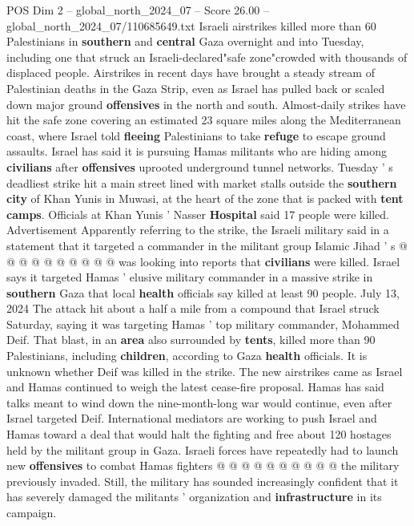 \begin{textsample}{POS Dim 2 – global\_north\_2024\_07 – Score 26.00 – global\_north\_2024\_07/110685649.txt}  \label{ex:f2_pos_389}
Israeli airstrikes killed more than 60 Palestinians in \textbf{southern} and \textbf{central} Gaza overnight and into Tuesday, including one that struck an Israeli-declared"safe zone"crowded with thousands of displaced people.
Airstrikes in recent days have brought a steady stream of Palestinian deaths in the Gaza Strip, even as Israel has pulled back or scaled down major ground \textbf{offensives} in the north and south.
Almost-daily strikes have hit the safe zone covering an estimated 23 square miles along the Mediterranean coast, where Israel told \textbf{fleeing} Palestinians to take \textbf{refuge} to escape ground assaults.
Israel has said it is pursuing Hamas militants who are hiding among \textbf{civilians} after \textbf{offensives} uprooted underground tunnel networks.
Tuesday ' s deadliest strike hit a main street lined with market stalls outside the \textbf{southern} \textbf{city} of Khan Yunis in Muwasi, at the heart of the zone that is packed with \textbf{tent} \textbf{camps}.
Officials at Khan Yunis ' Nasser \textbf{Hospital} said 17 people were killed.
Advertisement Apparently referring to the strike, the Israeli military said in a statement that it targeted a commander in the militant group Islamic Jihad ' s @ @ @ @ @ @ @ @ @ @ was looking into reports that \textbf{civilians} were killed.
Israel says it targeted Hamas ' elusive military commander in a massive strike in \textbf{southern} Gaza that local \textbf{health} officials say killed at least 90 people.
July 13, 2024 The attack hit about a half a mile from a compound that Israel struck Saturday, saying it was targeting Hamas ' top military commander, Mohammed Deif.
That blast, in an \textbf{area} also surrounded by \textbf{tents}, killed more than 90 Palestinians, including \textbf{children}, according to Gaza \textbf{health} officials.
It is unknown whether Deif was killed in the strike.
The new airstrikes came as Israel and Hamas continued to weigh the latest cease-fire proposal.
Hamas has said talks meant to wind down the nine-month-long war would continue, even after Israel targeted Deif.
International mediators are working to push Israel and Hamas toward a deal that would halt the fighting and free about 120 hostages held by the militant group in Gaza.
Israeli forces have repeatedly had to launch new \textbf{offensives} to combat Hamas fighters @ @ @ @ @ @ @ @ @ @ the military previously invaded.
Still, the military has sounded increasingly confident that it has severely damaged the militants ' organization and \textbf{infrastructure} in its campaign.

\end{textsample}
